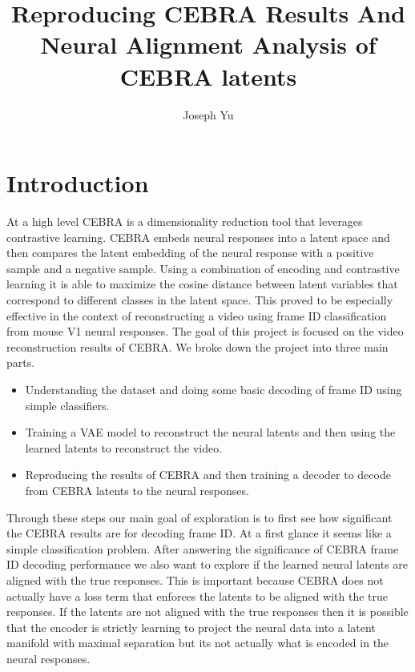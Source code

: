 \documentclass[12pt, letterpaper]{article}
\author{Joseph Yu}
\title{Reproducing CEBRA Results And Neural Alignment Analysis of CEBRA latents}
\begin{document}
\maketitle
\section{Introduction}
At a high level CEBRA is a dimensionality reduction tool that leverages contrastive learning. CEBRA embeds neural responses into a latent space and then compares the latent embedding of the neural response with a positive sample and a negative sample. Using a combination of encoding and contrastive learning it is able to maximize the cosine distance between latent variables that correspond to different classes in the latent space. This proved to be especially effective in the context of reconstructing a video using frame ID classification from mouse V1 neural responses. The goal of this project is focused on the video reconstruction results of CEBRA. We broke down the project into three main parts. 
\begin{itemize}
    \item Understanding the dataset and doing some basic decoding of frame ID using simple classifiers.
    \item Training a VAE model to reconstruct the neural latents and then using the learned latents to reconstruct the video.
    \item Reproducing the results of CEBRA and then training a decoder to decode from CEBRA latents to the neural responses.
\end{itemize}

Through these steps our main goal of exploration is to first see how significant the CEBRA results are for decoding frame ID. At a first glance it seems like a simple classification problem. After answering the significance of CEBRA frame ID decoding performance we also want to explore if the learned neural latents are aligned with the true responses. This is important because CEBRA does not actually have a loss term that enforces the latents to be aligned with the true responses. If the latents are not aligned with the true responses then it is possible that the encoder is strictly learning to project the neural data into a latent manifold with maximal separation but its not actually what is encoded in the neural responses.
\end{document}

